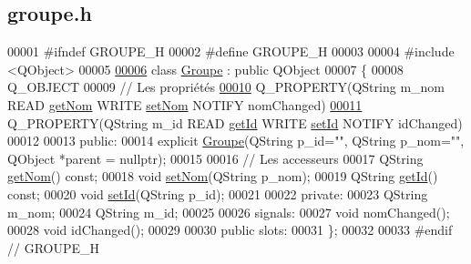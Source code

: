 \hypertarget{groupe_8h_source}{}\subsection{groupe.\+h}
\label{groupe_8h_source}

\begin{DoxyCode}
00001 \textcolor{preprocessor}{#ifndef GROUPE\_H}
00002 \textcolor{preprocessor}{#define GROUPE\_H}
00003 
00004 \textcolor{preprocessor}{#include <QObject>}
00005 
\hyperlink{class_groupe}{00006} \textcolor{keyword}{class }\hyperlink{class_groupe}{Groupe} : \textcolor{keyword}{public} QObject
00007 \{
00008     Q\_OBJECT
00009     \textcolor{comment}{// Les propriétés}
\hyperlink{class_groupe_ad76b271599f46c8a350f8afa3bc884c5}{00010}     Q\_PROPERTY(QString m\_nom READ \hyperlink{class_groupe_a88bf0b7a0e69d549fa3fdb1b01c0de2c}{getNom} WRITE \hyperlink{class_groupe_a44566810eab44cd98be317f4d803a45e}{setNom} NOTIFY nomChanged)
\hyperlink{class_groupe_ae837f3752cea27d8ab7678d4d1e4a764}{00011}     Q\_PROPERTY(QString m\_id READ \hyperlink{class_groupe_aadab27e8d3f4a050a7bc4ae23c95efa7}{getId} WRITE \hyperlink{class_groupe_a3cb79da346bcd56dee1c8305050fde60}{setId} NOTIFY idChanged)
00012 
00013 public:
00014     explicit \hyperlink{class_groupe}{Groupe}(QString p\_id="", QString p\_nom="", QObject *parent = \textcolor{keywordtype}{nullptr});
00015 
00016     \textcolor{comment}{// Les accesseurs}
00017     QString \hyperlink{class_groupe_a88bf0b7a0e69d549fa3fdb1b01c0de2c}{getNom}() const;
00018     \textcolor{keywordtype}{void} \hyperlink{class_groupe_a44566810eab44cd98be317f4d803a45e}{setNom}(QString p\_nom);
00019     QString \hyperlink{class_groupe_aadab27e8d3f4a050a7bc4ae23c95efa7}{getId}() const;
00020     \textcolor{keywordtype}{void} \hyperlink{class_groupe_a3cb79da346bcd56dee1c8305050fde60}{setId}(QString p\_id);
00021 
00022 private:
00023     QString m\_nom;
00024     QString m\_id;
00025 
00026 signals:
00027     \textcolor{keywordtype}{void} nomChanged();
00028     \textcolor{keywordtype}{void} idChanged();
00029 
00030 public slots:
00031 \};
00032 
00033 \textcolor{preprocessor}{#endif // GROUPE\_H}
\end{DoxyCode}
